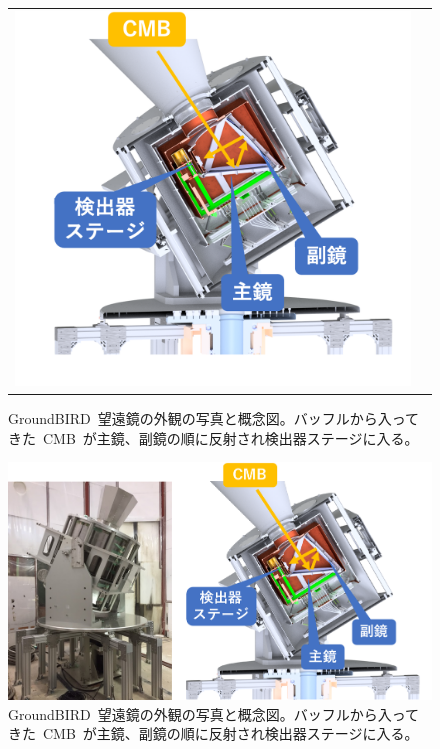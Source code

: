 \begin{figure}[h]
\begin{tabular}{cc}
\begin{minipage}[t]{0.65\hsize}
      \includegraphics[keepaspectratio, scale=0.35]{2_cosmology/figs/gb_int.png}
    \end{minipage}
  \end{tabular}
  \caption{GroundBIRD~望遠鏡の外観の写真と概念図。バッフルから入ってきた~CMB~が主鏡、副鏡の順に反射され検出器ステージに入る。}
  \label{gb}
\end{figure}
\fi

\begin{figure}[htbp]
  \centering
  \includegraphics[width=1\columnwidth]{2_cosmology/figs/gb.pdf}
  \caption{GroundBIRD~望遠鏡の外観の写真と概念図。バッフルから入ってきた~CMB~が主鏡、副鏡の順に反射され検出器ステージに入る。}
  \label{gb}
\end{figure}


